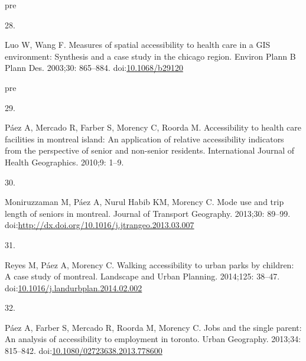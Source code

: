 \documentclass[10pt,letterpaper]{article}
\newlength{\cslhangindent}
\newlength{\csllabelwidth}
\newlength{\cslentryspacingunit} %
\newenvironment{CSLReferences}[2] %
 {%
  \setlength{\parindent}{0pt}
  \ifodd #1
  \let\oldpar\par
  \def\par{\hangindent=\cslhangindent\oldpar}
  \fi
  \setlength{\parskip}{#2\cslentryspacingunit}
 }%
 {}
\newcommand{\CSLLeftMargin}[1]{\parbox[t]{\csllabelwidth}{#1}}
\newcommand{\CSLRightInline}[1]{\parbox[t]{\linewidth - \csllabelwidth}{#1}\break}
\providecommand{\DIFaddtex}[1]{{\protect\color{blue}\uwave{#1}}} %
\providecommand{\DIFaddbegin}{} %
\providecommand{\DIFaddend}{} %
\providecommand{\DIFdelbegin}{} %
\providecommand{\DIFdelend}{} %
\providecommand{\DIFadd}[1]{\texorpdfstring{\DIFaddtex{#1}}{#1}} %
\newcommand{\DIFscaledelfig}{0.5}
\newlength{\DIFdelgraphicswidth} %
\newlength{\DIFdelgraphicsheight} %
\newcommand{\DIFaddincludegraphics}[2][]{{\color{blue}\fbox{\DIFOincludegraphics[#1]{#2}}}} %
\newcommand{\DIFdelincludegraphics}[2][]{%
\sbox{\DIFdelgraphicsbox}{\DIFOincludegraphics[#1]{#2}}%
\settoboxwidth{\DIFdelgraphicswidth}{\DIFdelgraphicsbox} %
\settoboxtotalheight{\DIFdelgraphicsheight}{\DIFdelgraphicsbox} %
\scalebox{\DIFscaledelfig}{%
\parbox[b]{\DIFdelgraphicswidth}{\usebox{\DIFdelgraphicsbox}\\[-\baselineskip] \rule{\DIFdelgraphicswidth}{0em}}\llap{\resizebox{\DIFdelgraphicswidth}{\DIFdelgraphicsheight}{%
\setlength{\unitlength}{\DIFdelgraphicswidth}%
\begin{picture}(1,1)%
\thicklines\linethickness{2pt} %
{\color[rgb]{1,0,0}\put(0,0){\framebox(1,1){}}}%
{\color[rgb]{1,0,0}\put(0,0){\line( 1,1){1}}}%
{\color[rgb]{1,0,0}\put(0,1){\line(1,-1){1}}}%
\end{picture}%
}\hspace*{3pt}}} %
} %
\DeclareRobustCommand{\DIFaddbegin}{\DIFOaddbegin \let\includegraphics\DIFaddincludegraphics} %
\DeclareRobustCommand{\DIFaddend}{\DIFOaddend \let\includegraphics\DIFOincludegraphics} %
\DeclareRobustCommand{\DIFdelbegin}{\DIFOdelbegin \let\includegraphics\DIFdelincludegraphics} %
\DeclareRobustCommand{\DIFdelend}{\DIFOaddend \let\includegraphics\DIFOincludegraphics} %
\begin{document}
\begin{CSLReferences}{0}{0}
\leavevmode\vadjust \DIFadd{pre}{\hypertarget{ref-luoMeasuresSpatialAccessibility2003}{}}%
\CSLLeftMargin{28. }%
\CSLRightInline{Luo W, Wang F. Measures of spatial accessibility to
health care in a {GIS} environment: Synthesis and a case study in the
chicago region. Environ Plann B Plann Des. 2003;30: 865--884.
doi:\href{https://doi.org/10.1068/b29120}{10.1068/b29120}}

\leavevmode\vadjust \DIFadd{pre}{\hypertarget{ref-paezHealth2010}{}}%
\CSLLeftMargin{29. }%
\DIFaddend \CSLRightInline{Páez A, Mercado R, Farber S, Morency C, Roorda M.
Accessibility to health care facilities in montreal island: An
application of relative accessibility indicators from the perspective of
senior and non-senior residents. International Journal of Health
Geographics. 2010;9: 1--9. }

\leavevmode{}%
\DIFdelbegin %
\DIFdelend \DIFaddbegin \CSLLeftMargin{30. }\DIFaddend %
\CSLRightInline{Moniruzzaman M, Páez A, Nurul Habib KM, Morency C. Mode
use and trip length of seniors in montreal. Journal of Transport
Geography. 2013;30: 89--99.
doi:\url{http://dx.doi.org/10.1016/j.jtrangeo.2013.03.007}}

\leavevmode{}%
\DIFdelbegin %
\DIFdelend \DIFaddbegin \CSLLeftMargin{31. }\DIFaddend %
\DIFdelbegin %
\DIFdelend \DIFaddbegin \CSLRightInline{Reyes M, Páez A, Morency C. Walking accessibility to
urban parks by children: A case study of montreal. Landscape and Urban
Planning. 2014;125: 38--47.
doi:\href{https://doi.org/10.1016/j.landurbplan.2014.02.002}{10.1016/j.landurbplan.2014.02.002}}
\DIFaddend 

\leavevmode{}%
\DIFdelbegin %
\DIFdelend \DIFaddbegin \CSLLeftMargin{32. }\DIFaddend %
\CSLRightInline{Páez A, Farber S, Mercado R, Roorda M, Morency C. Jobs
and the single parent: An analysis of accessibility to employment in
toronto. Urban Geography. 2013;34: 815--842.
doi:\href{https://doi.org/10.1080/02723638.2013.778600}{10.1080/02723638.2013.778600}}


\end{CSLReferences}
\end{document}
